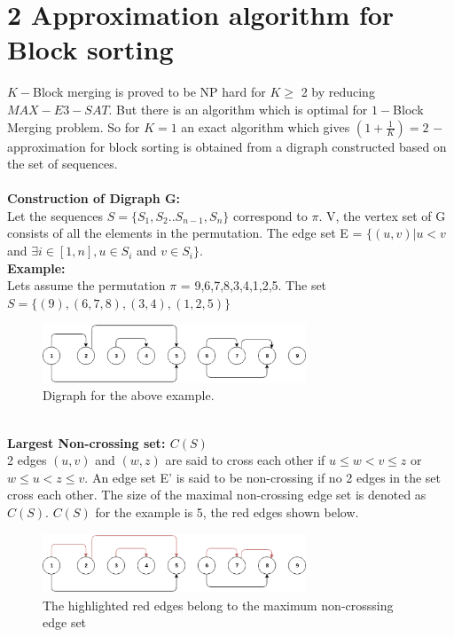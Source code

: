 \documentclass[BTech]{iitmdiss}
\begin{document}
\section{2 Approximation algorithm for Block sorting}
$K-$Block merging is proved to be NP hard for $K \geq$ 2 by reducing $MAX-E3-SAT$. But there is an algorithm which is optimal for $1-$Block Merging problem. So for $K = 1$ an exact algorithm which gives $(1+\frac{1}{K}) = 2$ $-$ approximation for block sorting is obtained from a digraph constructed based on the set of sequences.\\~\\
\noindent
\textbf{Construction of Digraph G:}\\
Let the sequences $S = \{S_1,S_2 .. S_{n-1},S_n\}$ correspond to $\pi$. V, the vertex set of G consists of all the elements in the permutation. The edge set E  = $\{(u,v)| u<v$ and $\exists i\in [1,n], u \in S_i$ and $v \in S_i \}$.\\
\textbf{Example:}\\
Lets assume the permutation $\pi$ = 9,6,7,8,3,4,1,2,5. The set $S = \{(9),(6,7,8),(3,4),(1,2,5)\}$
\begin{figure}[htpb]
  \begin{center}
  \includegraphics[width=0.7\textwidth]{digraph1.eps}
    \caption {Digraph for the above example.}
  \end{center}
\end{figure}
\\
\noindent
\textbf{Largest Non-crossing set: $C(S)$}\\
2 edges $(u,v)$ and $(w,z)$ are said to cross each other if $u\leq w < v \leq z$ or $w\leq u < z \leq v$. An edge set E' is said to be non-crossing if no 2 edges in the set cross each other. The size of the maximal non-crossing edge set is denoted as $C(S).$ $C(S)$ for the example is 5, the red edges shown below.
\begin{figure}[htpb]
  \begin{center}
  \includegraphics[width=0.7\textwidth]{digraph2.eps}
    \caption {The highlighted red edges belong to the maximum non-crosssing edge set}
  \end{center}
\end{figure}
\end{document}
